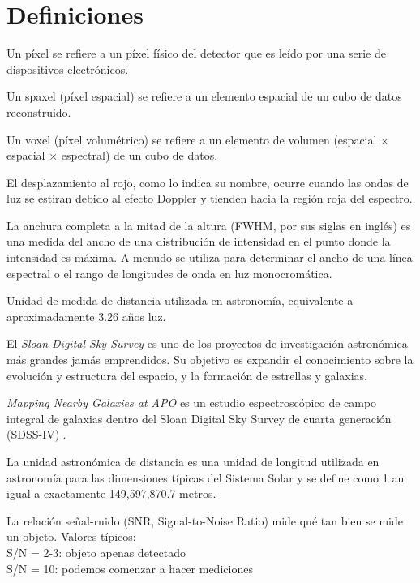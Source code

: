 \documentclass[9pt,twocolumn,a4paper]{opticajnl}
\begin{document}
\section*{Definiciones}
\begin{description}[style=nextline]
  \item[pixel] Un píxel se refiere a un píxel físico del detector que es leído por una serie de dispositivos electrónicos.
  \item[spaxel] Un spaxel (píxel espacial) se refiere a un elemento espacial de un cubo de datos reconstruido.
  \item[voxel] Un voxel (píxel volumétrico) se refiere a un elemento de volumen (espacial × espacial × espectral) de un cubo de datos. 
  \item[redshift] El desplazamiento al rojo, como lo indica su nombre, ocurre cuando las ondas de luz se estiran debido al efecto Doppler y tienden hacia la región roja del espectro.
  \item[FWHM] La anchura completa a la mitad de la altura (FWHM, por sus siglas en inglés) es una medida del ancho de una distribución de intensidad en el punto donde la intensidad es máxima. A menudo se utiliza para determinar el ancho de una línea espectral o el rango de longitudes de onda en luz monocromática. 
  \item[pársec] Unidad de medida de distancia utilizada en astronomía, equivalente a aproximadamente 3.26 años luz.
  \item[SDSS] El \textit{Sloan Digital Sky Survey} es uno de los proyectos de investigación astronómica más grandes jamás emprendidos. Su objetivo es expandir el conocimiento sobre la evolución y estructura del espacio, y la formación de estrellas y galaxias.
  \item[MaNGA] \textit{Mapping Nearby Galaxies at APO} es un estudio espectroscópico de campo integral de galaxias dentro del Sloan Digital Sky Survey de cuarta generación (SDSS-IV) \cite{weijmans2015manga}.
  \item[Unidad Astronómica / au] La unidad astronómica de distancia es una unidad de longitud utilizada en astronomía para las dimensiones típicas del Sistema Solar y se define como 1 au igual a exactamente 149,597,870.7 metros.
  \item[S/N] La relación señal-ruido (SNR, Signal-to-Noise Ratio) mide qué tan bien se mide un objeto. Valores típicos: \\
  S/N = 2-3: objeto apenas detectado \\
  S/N = 10: podemos comenzar a hacer mediciones \\

\end{description}
\end{document}
